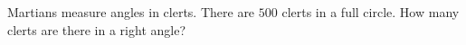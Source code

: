 Martians measure angles in clerts. There are $500$ clerts in a full circle. How many clerts are there in a right angle?
